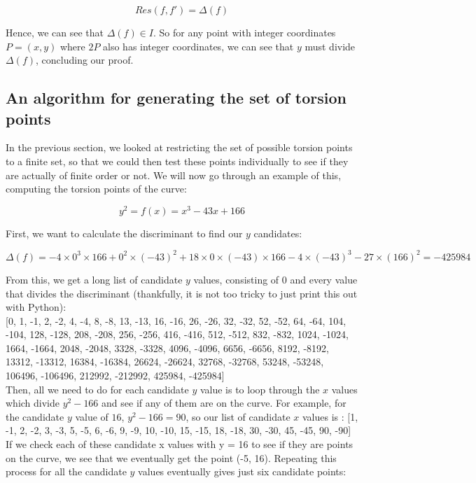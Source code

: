 \documentclass{article}
\begin{document}
\[ Res(f, f') = \Delta(f) \]

Hence, we can see that $\Delta(f) \in I$. So for any point with integer coordinates $P = (x, y)$ where $2P$ also has integer coordinates, we can see that $y$ must divide $\Delta(f)$, concluding our proof.


\subsection{An algorithm for generating the set of torsion points}

In the previous section, we looked at restricting the set of possible torsion points to a finite set, so that we could then test these points individually to see if they are actually of finite order or not. We will now go through an example of this, computing the torsion points of the curve:

\[y^2 = f(x) = x^3 - 43 x + 166\]

First, we want to calculate the discriminant to find our $y$ candidates:

\[\Delta(f) =  -4 \times 0^3 \times 166 + 0^2 \times (-43)^2 + 18 \times 0 \times (-43) \times 166 - 4 \times (-43)^3 - 27 \times (166)^2 = -425984\]

From this, we get a long list of candidate $y$ values, consisting of 0 and every value that divides the discriminant (thankfully, it is not too tricky to just print this out with Python):\\

[0, 1, -1, 2, -2, 4, -4, 8, -8, 13, -13, 16, -16, 26, -26, 32, -32, 52, -52, 64, -64, 104, -104, 128, -128, 208, -208, 256, -256, 416, -416, 512, -512, 832, -832, 1024, -1024, 1664, -1664, 2048, -2048, 3328, -3328, 4096, -4096, 6656, -6656, 8192, -8192, 13312, -13312, 16384, -16384, 26624, -26624, 32768, -32768, 53248, -53248, 106496, -106496, 212992, -212992, 425984, -425984]\\

Then, all we need to do for each candidate $y$ value is to loop through the $x$ values which divide $y^2 - 166$ and see if any of them are on the curve. For example, for the candidate $y$ value of $16$, $y^2 - 166 = 90$, so our list of candidate $x$ values is : [1, -1, 2, -2, 3, -3, 5, -5, 6, -6, 9, -9, 10, -10, 15, -15, 18, -18, 30, -30, 45, -45, 90, -90] If we check each of these candidate x values with y = 16 to see if they are points on the curve, we see that we eventually get the point (-5, 16). Repeating this process for all the candidate $y$ values eventually  gives just six candidate points:
\end{document}
